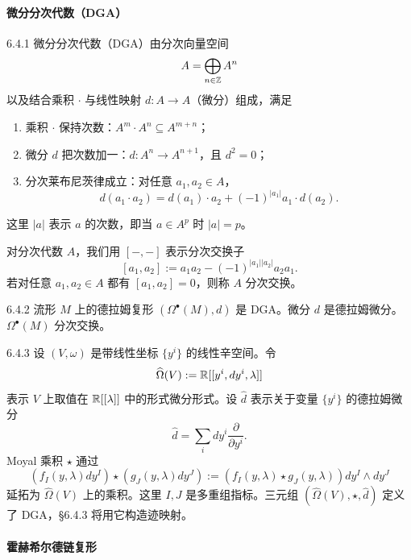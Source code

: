 \paragraph{微分分次代数（DGA）}\par

\begin{definition}{6.4.1}
  微分分次代数（DGA）由分次向量空间
  \[
  A=\bigoplus_{n\in\mathbb{Z}}A^n
  \]
  以及结合乘积 $\cdot$ 与线性映射 $d:A\to A$（微分）组成，满足
  \begin{enumerate}[label=(\arabic*),leftmargin=3.2em,itemsep=1pt]
    \item 乘积 $\cdot$ 保持次数：$A^m\cdot A^n\subseteq A^{m+n}$；
    \item 微分 $d$ 把次数加一：$d:A^n\to A^{n+1}$，且 $d^2=0$；
    \item 分次莱布尼茨律成立：对任意 $a_1,a_2\in A$，
    \[
    d(a_1\cdot a_2)=d(a_1)\cdot a_2+(-1)^{|a_1|}a_1\cdot d(a_2).
    \]
  \end{enumerate}
\end{definition}

这里 $|a|$ 表示 $a$ 的次数，即当 $a\in A^p$ 时 $|a|=p$。

对分次代数 $A$，我们用 $[-,-]$ 表示分次交换子
\[
[a_1,a_2]:=a_1a_2-(-1)^{|a_1||a_2|}a_2a_1.
\]
若对任意 $a_1,a_2\in A$ 都有 $[a_1,a_2]=0$，则称 $A$ 分次交换。

\begin{example}{6.4.2}
  流形 $M$ 上的德拉姆复形 $(\Omega^\bullet(M),d)$ 是 DGA。微分 $d$ 是德拉姆微分。$\Omega^\bullet(M)$ 分次交换。
\end{example}

\begin{example}{6.4.3}
  设 $(V,\omega)$ 是带线性坐标 $\{y^i\}$ 的线性辛空间。令
  \[
  \widehat\Omega(V):=\mathbb{R}[[y^i,dy^i,\lambda]]
  \]
  表示 $V$ 上取值在 $\mathbb{R}[[\lambda]]$ 中的形式微分形式。设 $\hat d$ 表示关于变量 $\{y^i\}$ 的德拉姆微分
  \[
  \hat d=\sum_idy^i\frac{\partial}{\partial y^i}.
  \]
  Moyal 乘积 $\star$ 通过
  \[
  (f_I(y,\lambda)dy^I)\star(g_J(y,\lambda)dy^J)
  :=(f_I(y,\lambda)\star g_J(y,\lambda))dy^I\wedge dy^J
  \]
  延拓为 $\widehat\Omega(V)$ 上的乘积。这里 $I,J$ 是多重组指标。三元组 $(\widehat\Omega(V),\star,\hat d)$ 定义了 DGA，§6.4.3 将用它构造迹映射。
\end{example}

\paragraph{霍赫希尔德链复形}\par

